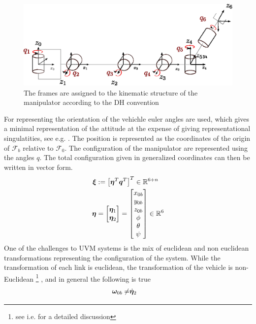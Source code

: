 \begin{figure}[h!]
	\centering
	\includegraphics[scale=0.7]{./figures/manipulator_kinematics.eps}
	\caption{The frames are assigned to the kinematic structure of the manipulator according to the DH convention}
	\label{fig:dh-manipulator}
\end{figure}
For representing the orientation of the vehichle euler angles are used, which gives a minimal representation of the attitude at the expense of giving representational singulatities, see e.g. \cite{fs}. The position is represented as the coordinates of the origin of $\mathcal{F}_b$ relative to $\mathcal{F}_0$. The configuration of the manipulator are represented using the angles $q$. The total configuration given in generalized coordinates can then be written in vector form.
\begin{align*}
  \boldsymbol \xi&:= \left[ \boldsymbol \eta^T \boldsymbol q^T \right]^T \in \mathbb{R}^{6+n}
  \\
  \boldsymbol \eta &= \begin{bmatrix}\boldsymbol \eta_1 \\ \boldsymbol \eta_2 \end{bmatrix}  = \begin{bmatrix} x_{0b} \\ y_{0b} \\ z_{0b} \\ \phi \\ \theta \\ \psi \end{bmatrix} \in \mathbb{R}^{6}
\end{align*}
One of the challenges to UVM systems is the mix of euclidean and non euclidean transformations representing the configuration of the system. While the transformation of each link is euclidean, the transformation of the vehicle is non-Euclidean \footnote{see i.e. \cite{kristin_jant} for a detailed discussion} , and in general the following is true
\begin{align}
	\boldsymbol \omega_{0b} \neq & \dot{\boldsymbol \eta}_2
  \label{eq:quasi1}
\end{align}
